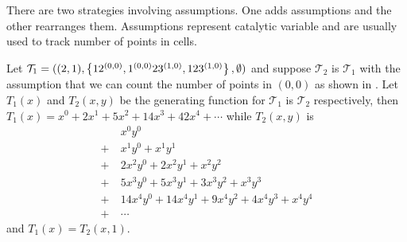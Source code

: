There are two strategies involving assumptions. One adds assumptions and the other rearranges them. Assumptions represent catalytic variable and are usually used to track number of points in cells. 

Let $\mathcal{T}_1 = ((2,1),\left\{12^{(0,0)},1^{(0,0)}23^{(1,0)},123^{(1,0)}\right\},\emptyset)$ and suppose $\mathcal{T}_2$ is $\mathcal{T}_1$ with the assumption that we can count the number of points in $(0,0)$ as shown in . Let $T_1(x)$ and $T_2(x,y)$ be the generating function for $\mathcal{T}_1$ is $\mathcal{T}_2$ respectively, then $T_1(x) = x^0 + 2x^1 + 5x^2 + 14x^3 + 42x^4 + \dotsm$ while $T_2(x,y)$ is
\begin{align*}
    &\ x^0y^0\\
    + &\ x^1y^0 + x^1y^1\\
    + &\ 2x^2y^0 + 2x^2y^1 + x^2y^2\\
    + &\ 5x^3y^0 + 5x^3y^1 + 3x^3y^2 + x^3y^3\\
    + &\ 14x^4y^0 + 14x^4y^1 + 9x^4y^2 + 4x^4y^3 + x^4y^4\\
    + &\ \dotsm  
\end{align*}
and $T_1(x) = T_2(x,1)$.

